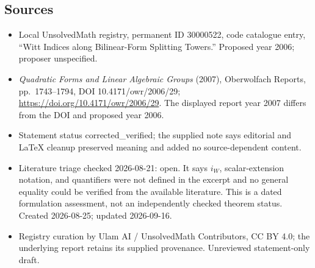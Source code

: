\documentclass[11pt]{article}
\begin{document}
\subsection{Sources}
\begin{itemize}
\item Local UnsolvedMath registry, permanent ID 30000522, code catalogue entry, ``Witt Indices along Bilinear-Form Splitting Towers.'' Proposed year 2006; proposer unspecified.
\item \emph{Quadratic Forms and Linear Algebraic Groups} (2007), Oberwolfach Reports, pp.\ 1743--1794, DOI 10.4171/owr/2006/29; \url{https://doi.org/10.4171/owr/2006/29}. The displayed report year 2007 differs from the DOI and proposed year 2006.
\item Statement status corrected\_verified; the supplied note says editorial and LaTeX cleanup preserved meaning and added no source-dependent content.
\item Literature triage checked 2026-08-21: open. It says $i_W$, scalar-extension notation, and quantifiers were not defined in the excerpt and no general equality could be verified from the available literature. This is a dated formulation assessment, not an independently checked theorem status. Created 2026-08-25; updated 2026-09-16.
\item Registry curation by Ulam AI / UnsolvedMath Contributors, CC BY 4.0; the underlying report retains its supplied provenance. Unreviewed statement-only draft.
\end{itemize}
\end{document}
